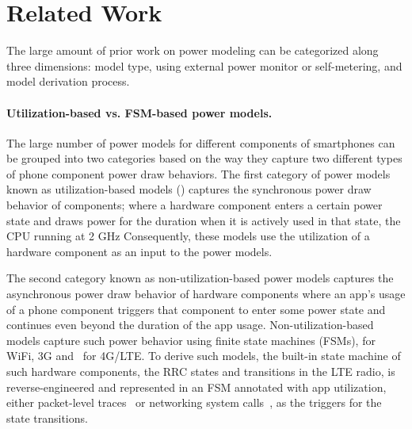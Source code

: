 \section{Related Work}
\label{sec:related}

The large amount of prior work on power modeling can be categorized along three dimensions: 
model type, using external power monitor or self-metering, and model derivation process.

\paragraph{Utilization-based vs. FSM-based power models.} 
The large number of power models for different components of
smartphones can be grouped into two categories based on the way they
capture two different types of phone component power draw behaviors.
The first category of power models known as utilization-based models
(\eg \cite{shye2009into,zhang2010accurate,hotpowermulticore}) captures
the synchronous power draw behavior of components; where a hardware
component enters a certain power state and draws power for the
duration when it is actively used in that state, \eg the CPU running
at 2 GHz
Consequently, these models use the utilization of a hardware component as an input to the power models.


The second category known as non-utilization-based power models captures the asynchronous power 
draw behavior of hardware components where an app’s usage of a phone component
triggers that component to enter some power state and continues even beyond the duration of the app usage.
Non-utilization-based models capture such power behavior using finite state machines (FSMs),
\eg \cite{arunabimc09,energybasedRA,aro,whatsup:mobicom12,pathak:eurosys12,ding:sigmetrics13}
for WiFi, 3G and~\cite{4glte} for 4G/LTE. 
To derive such models, the built-in state machine of such hardware components, \eg the RRC states and
transitions in the LTE radio, is reverse-engineered and represented in an FSM
annotated with app utilization, \eg either packet-level traces~\cite{rrc:imc2010,4glte} or
networking system calls~\cite{pathak:eurosys12}, as the triggers for the state transitions.

